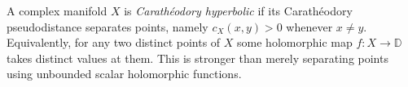 
A complex manifold $X$ is \emph{Carathéodory hyperbolic} if its Carathéodory pseudodistance separates points, namely $c_X(x,y)>0$ whenever $x\ne y$. Equivalently, for any two distinct points of $X$ some holomorphic map $f:X\to\mathbb D$ takes distinct values at them. This is stronger than merely separating points using unbounded scalar holomorphic functions.
